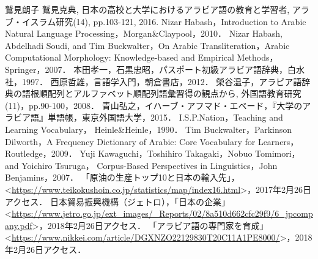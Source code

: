 \documentclass[technicalreport]{ieicej}
\begin{document}
\begin{thebibliography}{99}
鷲見朗子 鷲見克典, 日本の高校と大学におけるアラビア語の教育と学習者, アラブ・イスラム研究(14), pp.103-121, 2016.
Nizar Habash，Introduction to Arabic Natural Language Processing，Morgan\&Claypool，2010．
Nizar Habash, Abdelhadi Soudi, and Tim Buckwalter，On Arabic Transliteration，Arabic Computational Morphology: Knowledge-based and Empirical Methods，Springer，2007．
本田孝一，石黒忠昭，パスポート初級アラビア語辞典，白水社，1997．
西原哲雄，言語学入門，朝倉書店，2012．
榮谷温子，アラビア語辞典の語根順配列とアルファベット順配列語彙習得の観点から, 外国語教育研究(11)，pp.90-100，2008．
青山弘之，イハーブ・アフマド・エベード，『大学のアラビア語』単語帳，東京外国語大学，2015．
I.S.P.Nation，Teaching and Learning Vocabulary， Heinle\&Heinle，1990．
Tim Buckwalter，Parkinson Dilworth，A Frequency Dictionary of Arabic: Core Vocabulary for Learners， Routledge，2009．
Yuji Kawaguchi，Toshihiro Takagaki，Nobuo Tomimori，and Yoichiro Tsuruga，
Corpus-Based Perspectives in Linguistics，John Benjamins，2007．
「原油の生産トップ10と日本の輸入先」， \textless \url{https://www.teikokushoin.co.jp/statistics/map/index16.html}\textgreater，2017年2月26日アクセス．
 日本貿易振興機構（ジェトロ），「日本の企業」\textless \url{https://www.jetro.go.jp/ext_images/_Reports/02/8a510d662cfc29f9/6_jpcompany.pdf}\textgreater，2018年2月26日アクセス．
「アラビア語の専門家を育成」\textless \url{https://www.nikkei.com/article/DGXNZO22129830T20C11A1PE8000/}\textgreater，2018年2月26日アクセス．
\end{thebibliography}
\end{document}

